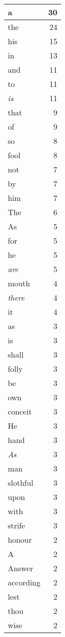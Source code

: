\begin{center}
\begin{longtable}{l|r}
a & 30\\ \hline 
the & 24\\ \hline 
his & 15\\ \hline 
in & 13\\ \hline 
and & 11\\ \hline 
to & 11\\ \hline 
\emph{is} & 11\\ \hline 
that & 9\\ \hline 
of & 9\\ \hline 
so & 8\\ \hline 
fool & 8\\ \hline 
not & 7\\ \hline 
by & 7\\ \hline 
him & 7\\ \hline 
The & 6\\ \hline 
As & 5\\ \hline 
for & 5\\ \hline 
he & 5\\ \hline 
\emph{are} & 5\\ \hline 
mouth & 4\\ \hline 
\emph{there} & 4\\ \hline 
it & 4\\ \hline 
as & 3\\ \hline 
is & 3\\ \hline 
shall & 3\\ \hline 
folly & 3\\ \hline 
be & 3\\ \hline 
own & 3\\ \hline 
conceit & 3\\ \hline 
He & 3\\ \hline 
hand & 3\\ \hline 
\emph{As} & 3\\ \hline 
man & 3\\ \hline 
slothful & 3\\ \hline 
upon & 3\\ \hline 
with & 3\\ \hline 
strife & 3\\ \hline 
honour & 2\\ \hline 
A & 2\\ \hline 
Answer & 2\\ \hline 
according & 2\\ \hline 
lest & 2\\ \hline 
thou & 2\\ \hline 
wise & 2\\ \hline 

\end{longtable}
\end{center}
